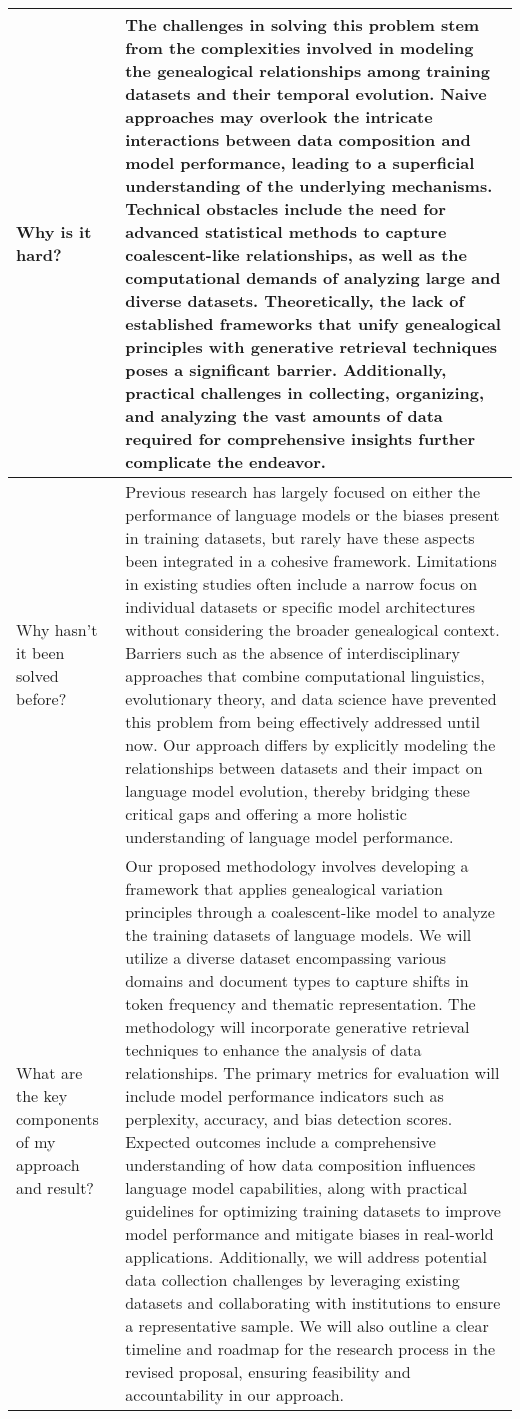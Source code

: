 \begin{table*}[htbp]
\begin{tabular}{p{3.5cm}p{12cm}}
\\ \midrule
Why is it hard? & 
The challenges in solving this problem stem from the complexities involved in modeling the genealogical relationships among training datasets and their temporal evolution. Naive approaches may overlook the intricate interactions between data composition and model performance, leading to a superficial understanding of the underlying mechanisms. Technical obstacles include the need for advanced statistical methods to capture coalescent-like relationships, as well as the computational demands of analyzing large and diverse datasets. Theoretically, the lack of established frameworks that unify genealogical principles with generative retrieval techniques poses a significant barrier. Additionally, practical challenges in collecting, organizing, and analyzing the vast amounts of data required for comprehensive insights further complicate the endeavor.
\\ \midrule
Why hasn't it been solved before? & 
Previous research has largely focused on either the performance of language models or the biases present in training datasets, but rarely have these aspects been integrated in a cohesive framework. Limitations in existing studies often include a narrow focus on individual datasets or specific model architectures without considering the broader genealogical context. Barriers such as the absence of interdisciplinary approaches that combine computational linguistics, evolutionary theory, and data science have prevented this problem from being effectively addressed until now. Our approach differs by explicitly modeling the relationships between datasets and their impact on language model evolution, thereby bridging these critical gaps and offering a more holistic understanding of language model performance.\\ \midrule
What are the key components of my approach and result? & 
Our proposed methodology involves developing a framework that applies genealogical variation principles through a coalescent-like model to analyze the training datasets of language models. We will utilize a diverse dataset encompassing various domains and document types to capture shifts in token frequency and thematic representation. The methodology will incorporate generative retrieval techniques to enhance the analysis of data relationships. The primary metrics for evaluation will include model performance indicators such as perplexity, accuracy, and bias detection scores. Expected outcomes include a comprehensive understanding of how data composition influences language model capabilities, along with practical guidelines for optimizing training datasets to improve model performance and mitigate biases in real-world applications. Additionally, we will address potential data collection challenges by leveraging existing datasets and collaborating with institutions to ensure a representative sample. We will also outline a clear timeline and roadmap for the research process in the revised proposal, ensuring feasibility and accountability in our approach.\\ 

\end{tabular}
\end{table*}
